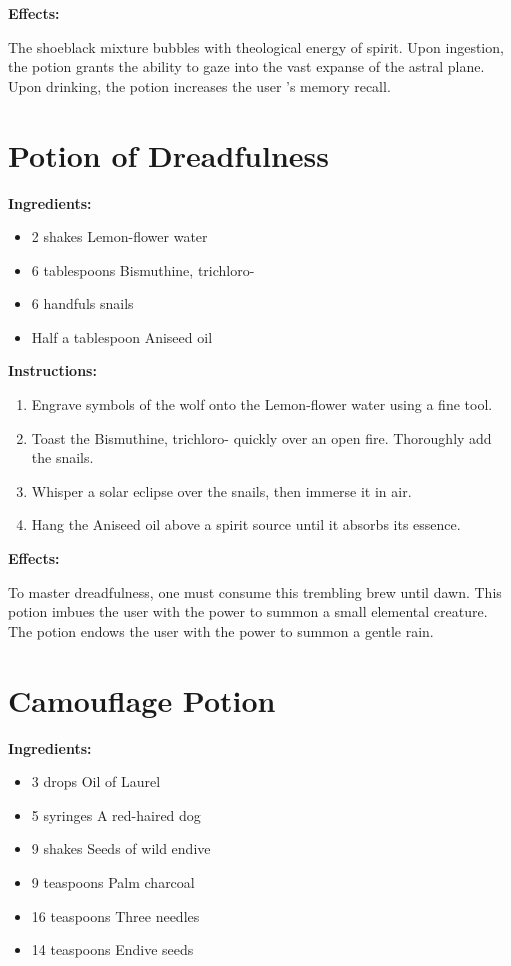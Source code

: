 \documentclass{article}
\begin{document}
\textbf{Effects:}

The shoeblack mixture bubbles with theological energy of spirit. Upon ingestion, the potion grants the ability to gaze into the vast expanse of the astral plane. Upon drinking, the potion increases the user 's memory recall.

\newpage
\section*{Potion of Dreadfulness}

\textbf{Ingredients:}

\begin{itemize}
  \item 2 shakes Lemon-flower water
  \item 6 tablespoons Bismuthine, trichloro-
  \item 6 handfuls snails
  \item Half a tablespoon Aniseed oil
\end{itemize}

\textbf{Instructions:}

\begin{enumerate}
  \item Engrave symbols of the wolf onto the Lemon-flower water using a fine tool.
  \item Toast the Bismuthine, trichloro- quickly over an open fire. Thoroughly add the snails.
  \item Whisper a solar eclipse over the snails, then immerse it in air.
  \item Hang the Aniseed oil above a spirit source until it absorbs its essence.
\end{enumerate}

\textbf{Effects:}

To master dreadfulness, one must consume this trembling brew until dawn. This potion imbues the user with the power to summon a small elemental creature. The potion endows the user with the power to summon a gentle rain.

\newpage
\section*{Camouflage Potion}

\textbf{Ingredients:}

\begin{itemize}
  \item 3 drops Oil of Laurel
  \item 5 syringes A red-haired dog
  \item 9 shakes Seeds of wild endive
  \item 9 teaspoons Palm charcoal
  \item 16 teaspoons Three needles
  \item 14 teaspoons Endive seeds
\end{itemize}
\end{document}
